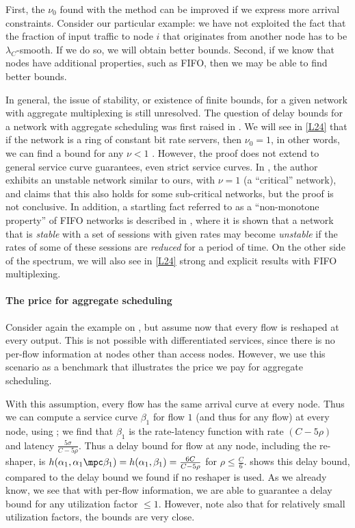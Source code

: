 First, the $\nu_0$ found with the method can be improved if we
express more arrival constraints. Consider our particular example:
we have not exploited the fact that the fraction of input traffic
to node $i$ that originates from another node has to be
$\lambda_C$-smooth. If we do so, we will obtain better bounds.
Second, if we know that nodes have additional properties, such as
FIFO, then we may be able to find better bounds.

In general, the issue of stability, or existence of finite bounds,
for a given network with aggregate multiplexing is still
unresolved. The question of delay bounds for a network with
aggregate scheduling was first raised in \cite{cha91}. We will see
in \cref{L24} that if the network is a ring of constant bit rate
servers, then $\nu_0=1$, in other words, we can find a bound for
any $\nu<1$ \cite{tg96}. However, the proof does not extend to
general service curve guarantees, even strict service curves. In
\cite{andrews00}, the author exhibits an unstable network similar
to ours, with $\nu=1$ (a ``critical'' network), and claims that
this also holds for some sub-critical networks, but the proof is
not conclusive. In addition, a startling fact referred to as a
``non-monotone property'' of FIFO networks is described in
\cite{andrews00}, where it is shown that a network that is
\emph{stable} with a set of sessions with given rates may become
\emph{unstable} if the rates of some of these sessions are
\emph{reduced} for a period of time. On the other side of the
spectrum, we will also see in \cref{L24} strong and explicit
results \cite{leb99,CFZF98} with FIFO multiplexing.

\paragraph{The price for aggregate scheduling}
Consider again the example on , but assume now
that every flow is reshaped at every output. This is not possible
with differentiated services, since there is no per-flow
information at nodes other than access nodes. However, we use this
scenario as a benchmark that illustrates the price we pay for
aggregate scheduling.

With this assumption, every flow has the same arrival curve at
every node. Thus we can compute a service curve $\beta_1$ for flow
$1$ (and thus for any flow) at every node, using ;
we find that $\beta_1$ is the rate-latency function with rate $(C-
5 \rho)$ and latency $\frac{5 \sigma}{C-5 \rho}$. Thus a delay
bound for flow at any node, including the re-shaper, is
$h(\alpha_1, \alpha_1 \mpc \beta_1)= h(\alpha_1,
\beta_1)=\frac{6C}{C- 5 \rho}$ for $\rho \leq \frac{C}{6}$.
 shows this delay bound, compared to the delay
bound we found if no reshaper is used. As we already know, we see
that with per-flow information, we are able to guarantee a delay
bound for any utilization factor $\leq 1$. However, note also that
for relatively small utilization factors, the bounds are very
close.

